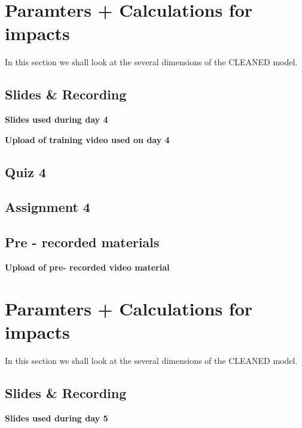 \documentclass[
]{book}
\begin{document}
\hypertarget{paramters-calculations-for-impacts}{%
\chapter{Paramters + Calculations for impacts}\label{paramters-calculations-for-impacts}}

In this section we shall look at the several dimensions of the CLEANED model.

\hypertarget{slides-recording}{%
\section{Slides \& Recording}\label{slides-recording}}

\textbf{Slides used during day 4}

\textbf{Upload of training video used on day 4}

\hypertarget{quiz-4}{%
\section{Quiz 4}\label{quiz-4}}

\hypertarget{assignment-4}{%
\section{Assignment 4}\label{assignment-4}}

\hypertarget{pre---recorded-materials}{%
\section{Pre - recorded materials}\label{pre---recorded-materials}}

\textbf{Upload of pre- recorded video material}

\hypertarget{paramters-calculations-for-impacts}{%
\chapter{Paramters + Calculations for impacts}\label{paramters-calculations-for-impacts}}

In this section we shall look at the several dimensions of the CLEANED model.

\hypertarget{slides-recording}{%
\section{Slides \& Recording}\label{slides-recording}}

\textbf{Slides used during day 5}
\end{document}
